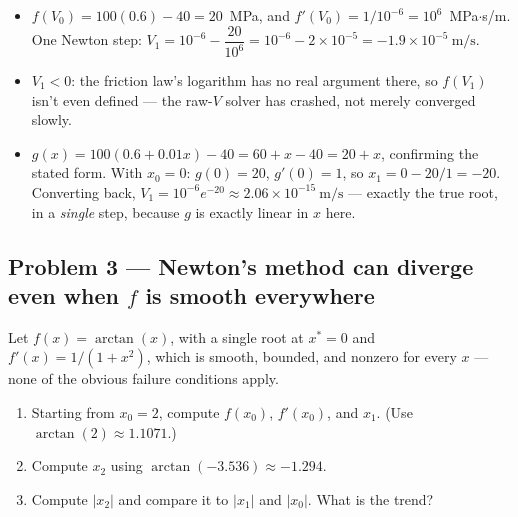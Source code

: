 \solution
\begin{itemize}
\item[(a)] $f(V_0) = 100(0.6) - 40 = 20$~MPa, and $f'(V_0) = 1/10^{-6} = 10^{6}$~MPa$\cdot$s/m. One Newton step: $V_1 = 10^{-6} - \dfrac{20}{10^{6}} = 10^{-6} - 2\times10^{-5} = -1.9\times10^{-5}\ \mathrm{m/s}$.
\item[(b)] $V_1<0$: the friction law's logarithm has no real argument there, so $f(V_1)$ isn't even defined --- the raw-$V$ solver has crashed, not merely converged slowly.
\item[(c)] $g(x) = 100(0.6+0.01x)-40 = 60+x-40 = 20+x$, confirming the stated form. With $x_0=0$: $g(0)=20$, $g'(0)=1$, so $x_1 = 0 - 20/1 = -20$. Converting back, $V_1 = 10^{-6}e^{-20} \approx 2.06\times10^{-15}\ \mathrm{m/s}$ --- exactly the true root, in a \emph{single} step, because $g$ is exactly linear in $x$ here.
\end{itemize}


\subsection*{Problem 3 --- Newton's method can diverge even when $f$ is smooth everywhere}

Let $f(x) = \arctan(x)$, with a single root at $x^\ast=0$ and $f'(x) = 1/(1+x^2)$, which is smooth, bounded, and nonzero for every $x$ --- none of the obvious failure conditions apply.

\begin{enumerate}[label=(\alph*)]
\item Starting from $x_0=2$, compute $f(x_0)$, $f'(x_0)$, and $x_1$. (Use $\arctan(2)\approx1.1071$.)
\item Compute $x_2$ using $\arctan(-3.536) \approx -1.294$.
\item Compute $|x_2|$ and compare it to $|x_1|$ and $|x_0|$. What is the trend?
\end{enumerate}

